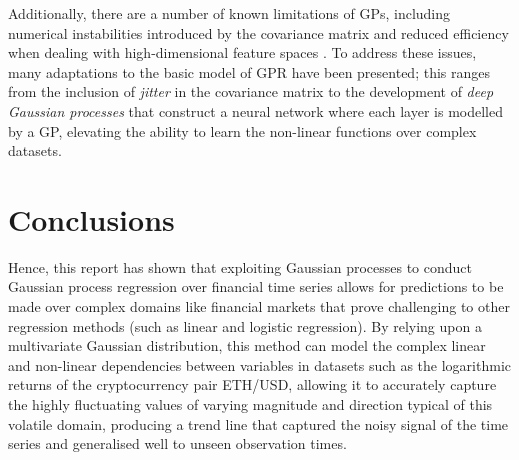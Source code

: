 \documentclass[a4paper, 11pt]{article}
\begin{document}
    Additionally, there are a number of known limitations of GPs, including numerical instabilities introduced by the covariance matrix and reduced efficiency when dealing with high-dimensional feature spaces \cite{bitvai-2016}. To address these issues, many adaptations to the basic model of GPR have been presented; this ranges from the inclusion of \emph{jitter} in the covariance matrix \cite{basak-2021} to the development of \emph{deep Gaussian processes} \cite{damianou-2013} that construct a neural network where each layer is modelled by a GP, elevating the ability to learn the non-linear functions over complex datasets. 

    \section{Conclusions}

    Hence, this report has shown that exploiting Gaussian processes to conduct Gaussian process regression over financial time series allows for predictions to be made over complex domains like financial markets that prove challenging to other regression methods (such as linear and logistic regression). By relying upon a multivariate Gaussian distribution, this method can model the complex linear and non-linear dependencies between variables in datasets such as the logarithmic returns of the cryptocurrency pair ETH/USD, allowing it to accurately capture the highly fluctuating values of varying magnitude and direction typical of this volatile domain, producing a trend line that captured the noisy signal of the time series and generalised well to unseen observation times.

    
\end{document}
